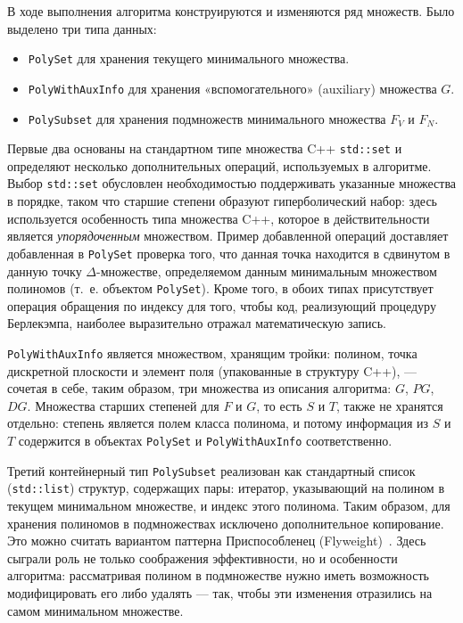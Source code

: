 \documentclass[14pt]{extarticle}
\begin{document}
В ходе выполнения алгоритма конструируются и изменяются ряд множеств. Было
выделено три типа данных:
\begin{itemize}
    \item \texttt{PolySet} для хранения текущего минимального множества.
    \item \texttt{PolyWithAuxInfo} для хранения «вспомогательного» (auxiliary)
    множества $G$.
    \item \texttt{PolySubset} для хранения подмножеств минимального множества
    $F_V$ и $F_N$.
\end{itemize}
Первые два основаны на стандартном типе множества C++ \texttt{std::set} и
определяют несколько дополнительных операций, используемых в алгоритме. Выбор
\texttt{std::set} обусловлен необходимостью поддерживать указанные множества в
порядке, таком что старшие степени образуют гиперболический набор: здесь
используется особенность типа множества C++, которое в действительности является
\emph{упорядоченным} множеством. Пример добавленной операций доставляет
добавленная в \texttt{PolySet} проверка того, что данная точка находится в
сдвинутом в данную точку $\Delta$-множестве, определяемом данным минимальным
множеством полиномов (т.~е. объектом \texttt{PolySet}). Кроме того, в обоих
типах присутствует операция обращения по индексу для того, чтобы код, реализующий
процедуру Берлекэмпа, наиболее выразительно отражал математическую запись.

\texttt{PolyWithAuxInfo} является множеством, хранящим тройки: полином, точка
дискретной плоскости и элемент поля (упакованные в структуру C++), — сочетая в
себе, таким образом, три множества из описания алгоритма: $G$, $PG$, $DG$.
Множества старших степеней для $F$ и $G$, то есть $S$ и $T$, также не хранятся
отдельно: степень является полем класса полинома, и потому информация из $S$ и
$T$ содержится в объектах \texttt{PolySet} и \texttt{PolyWithAuxInfo}
соответственно.

Третий контейнерный тип \texttt{PolySubset} реализован как стандартный список
(\texttt{std::list}) структур, содержащих пары: итератор, указывающий на полином в
текущем минимальном множестве, и индекс этого полинома. Таким образом, для
хранения полиномов в подмножествах исключено дополнительное копирование. Это
можно считать вариантом паттерна Приспособленец (Flyweight)~\cite{GoF}. Здесь
сыграли роль не только соображения эффективности, но и особенности алгоритма:
рассматривая полином в подмножестве нужно иметь возможность модифицировать его
либо удалять — так, чтобы эти изменения отразились на самом минимальном
множестве.
\end{document}
